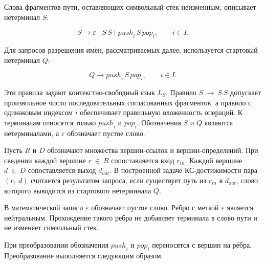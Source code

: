Слова фрагментов пути, оставляющих символьный стек неизменным, описывает нетерминал \(S\):

\[S \to \varepsilon \mid S\,S \mid {push}_{i}\,S\,{pop}_{i},\qquad i \in I.\]

Для запросов разрешения имён, рассматриваемых далее, используется стартовый нетерминал \(Q\):

\[Q \to {push}_{i}\,S\,{pop}_{i},\qquad i \in I.\]

Эти правила задают контекстно-свободный язык \(L_{S}\). Правило \(S\  \rightarrow \ S\ S\) допускает произвольное число последовательных согласованных фрагментов, а правило с одинаковым индексом \(i\) обеспечивает правильную вложенность операций. К терминалам относятся только \({push}_{i}\) и \({pop}_{i}\). Обозначения \(S\) и \(Q\) являются нетерминалами, а \(\varepsilon\) обозначает пустое слово.

Пусть \(R\) и \(D\) обозначают множества вершин-ссылок и вершин-определений. При сведении каждой вершине \(r\  \in \ R\) сопоставляется вход \(r_{in}\). Каждой вершине \(d\  \in \ D\) сопоставляется выход \(d_{out}\). В построенной задаче КС-достижимости пара \((r,\ d)\) считается результатом запроса, если существует путь из \(r_{in}\) в \(d_{out}\), слово которого выводится из стартового нетерминала \(Q\).

В математической записи \(\varepsilon\) обозначает пустое слово. Ребро с меткой \(\varepsilon\) является нейтральным. Прохождение такого ребра не добавляет терминала в слово пути и не изменяет символьный стек.

При преобразовании обозначения \({push}_{i}\) и \({pop}_{i}\) переносятся с вершин на рёбра. Преобразование выполняется следующим образом.

